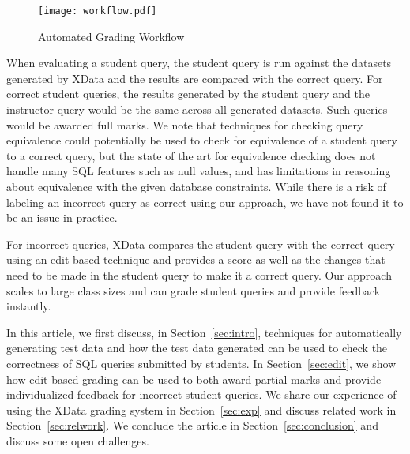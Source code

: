 \begin{figure}
	\centering\texttt{[image: workflow.pdf]}
		\caption{Automated Grading Workflow}
		\label{fig:workflow}
\end{figure}


When evaluating a student query, the student query is run against the datasets generated by XData and the results are compared with the correct query. For correct student queries, the results generated by the student query and the instructor query would be the same across all generated datasets. Such queries would be awarded full marks. We note that techniques for checking query equivalence could potentially be used to check for equivalence of a student query to a correct query, but the state of the art for equivalence checking does not handle many SQL features such as null values, and has limitations in reasoning about equivalence with the given database constraints.  While there is a risk of labeling an incorrect query as correct using our approach, we have not found it to be an issue in practice.

For incorrect queries, XData compares the student query with the correct query using an edit-based technique and provides a score as well as the changes that need to be made in the student query to make it a correct query. Our approach scales to large class sizes and can grade student queries and provide feedback instantly. 

In this article, we first discuss, in Section~\ref{sec:intro}, techniques for automatically generating test data and how the test data generated can be used to check the correctness of SQL queries submitted by students. In Section~\ref{sec:edit}, we show how edit-based grading can be used to both award partial marks and provide individualized feedback for incorrect student queries. We share our experience of using the XData grading system in Section~\ref{sec:exp} and discuss related work in Section~\ref{sec:relwork}. We conclude the article in Section~\ref{sec:conclusion} and discuss some open challenges.  

